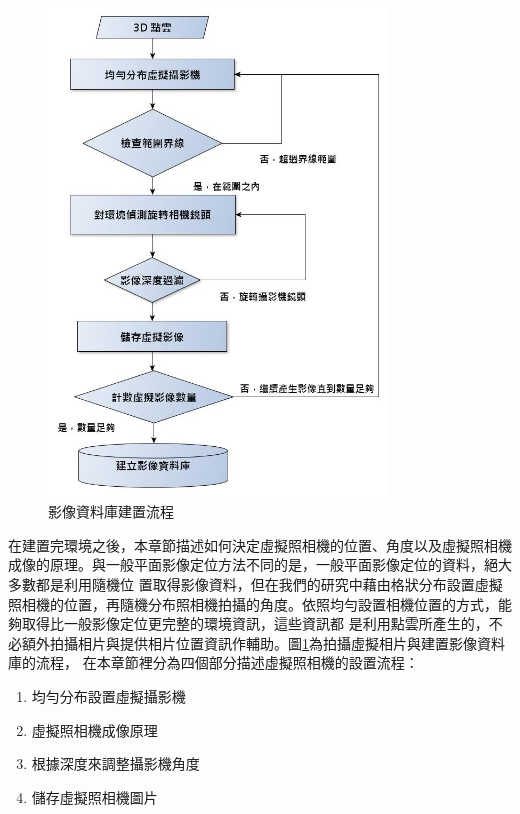 \begin{figure}
\begin{center}
  \includegraphics[width=0.8\textwidth]{figures/Virtual_Image_Database.jpg}
  \caption{影像資料庫建置流程}
  \label{fig:Environment Building Process}  
\end{center}
\end{figure}	

	在建置完環境之後，本章節描述如何決定虛擬照相機的位置、角度以及虛擬照相機成像的原理。與一般平面影像定位方法不同的是，一般平面影像定位的資料，絕大多數都是利用隨機位
	置取得影像資料，但在我們的研究中藉由格狀分布設置虛擬照相機的位置，再隨機分布照相機拍攝的角度。依照均勻設置相機位置的方式，能夠取得比一般影像定位更完整的環境資訊，這些資訊都
	是利用點雲所產生的，不必額外拍攝相片與提供相片位置資訊作輔助。圖\ref{fig:Environment Building Process}為拍攝虛擬相片與建置影像資料庫的流程，
	在本章節裡分為四個部分描述虛擬照相機的設置流程：
	
	\begin{enumerate}
		\item 均勻分布設置虛擬攝影機
    	\item 虛擬照相機成像原理
    	\item 根據深度來調整攝影機角度
    	\item 儲存虛擬照相機圖片
	\end{enumerate}		


